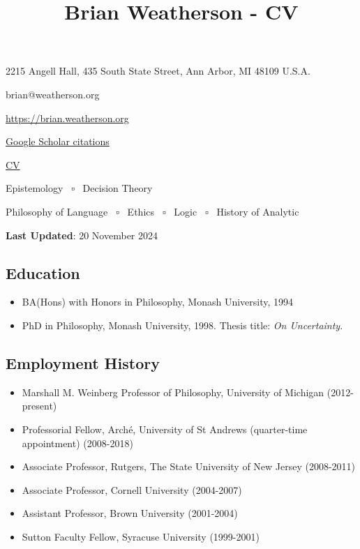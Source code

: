 \documentclass[
  10pt,
  letterpaper,
  DIV=11,
  numbers=noendperiod,
  twoside]{scrartcl}
\title{Brian Weatherson - CV}
\author{}
\date{}
\providecommand{\tightlist}{%
  \setlength{\itemsep}{0pt}\setlength{\parskip}{0pt}}\usepackage{longtable,booktabs,array}
\begin{document}
\maketitle


2215 Angell Hall, 435 South State Street, Ann Arbor, MI 48109 U.S.A.

 brian@weatherson.org

 \url{https://brian.weatherson.org}

\href{https://scholar.google.com/citations?user=rz5RF8kAAAAJ&hl=en}{Google
Scholar citations}

 \href{https://brian.weatherson.org/quarto/cv.pdf}{CV}

\begin{description}
\tightlist
\item[AOS]
Epistemology ~▫~ Decision Theory
\item[AOC]
Philosophy of Language ~▫~ Ethics ~▫~ Logic ~▫~ History of Analytic
\end{description}

\textbf{Last Updated}: 20 November 2024

\subsection{Education}\label{education}

\begin{itemize}
\tightlist
\item
  BA(Hons) with Honors in Philosophy, Monash University, 1994
\item
  PhD in Philosophy, Monash University, 1998. Thesis title: \emph{On
  Uncertainty}.
\end{itemize}

\subsection{Employment History}\label{employment-history}

\begin{itemize}
\tightlist
\item
  Marshall M. Weinberg Professor of Philosophy, University of Michigan
  (2012-present)
\item
  Professorial Fellow, Arché, University of St Andrews (quarter-time
  appointment) (2008-2018)
\item
  Associate Professor, Rutgers, The State University of New Jersey
  (2008-2011)
\item
  Associate Professor, Cornell University (2004-2007)
\item
  Assistant Professor, Brown University (2001-2004)
\item
  Sutton Faculty Fellow, Syracuse University (1999-2001)
\end{itemize}
\end{document}
